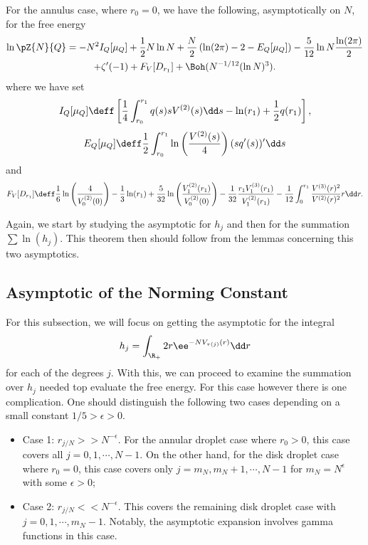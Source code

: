 \begin{teorema} 	\label{Theorem: Disk Free Energy}
	For the annulus case, where $r_0 = 0$, we have the following, asymptotically on $N$, for the free energy
	\begin{multline}
		\ln{\pZ{N}{Q}} = - N^2 I_Q[\mu_Q]  + \frac{1}{2} N \ln N + \frac{N}{2} \left(\ln(2\pi) - 2 - E_Q[\mu_Q]\right) - \frac{5}{12} \ln N \frac{\ln(2\pi)}{2} \\ + \zeta'(-1) + F_V[D_{r_1}] + \Boh(N^{-1/12}(\ln N)^3).
	\end{multline}
	where we have set
	\begin{equation}
		I_Q[\mu_Q] \deff \left[\frac{1}{4} \int_{r_0}^{r_1} q(s) s V^{(2)}(s) \dd s- \ln(r_1) + \frac{1}{2} q(r_1) \right],
	\end{equation}
	\begin{equation}
		E_Q[\mu_Q] \deff \frac{1}{2} \int_{r_0}^{r_1} \ln\left(\frac{V^{(2)}(s)}{4}\right) (sq'(s))' \dd s
	\end{equation}
	and
	\begin{equation}
		F_V[D_{r_1}] \deff \frac{1}{6} \ln{\left(\frac{4}{V^{(2)}_0(0)}\right)} - \frac{1}{3} \ln(r_1) + \frac{5}{32} \ln\left( \frac{V^{(2)}_1(r_1)}{V^{(2)}_{0}(0)} \right) - \frac{1}{32} \frac{r_1  V^{(3)}_1(r_1)}{V^{(2)}_1(r_1)} - \frac{1}{12} \int_{0}^{r_1} \frac{V^{(3)}(r)^2}{V^{(2)}(r)^{2}} r \dd r.
	\end{equation}
\end{teorema}

Again, we start by studying the asymptotic for $h_j$ and then for the summation $\sum \ln(h_j)$. This theorem then should follow from the lemmas concerning this two asymptotics.

\subsection{Asymptotic of the Norming Constant}

For this subsection, we will focus on getting the asymptotic for the integral
\begin{equation}
	h_j = \int_{\R_+} 2r \ee^{-N V_{\tau(j)}(r)} \dd r
\end{equation}
for each of the degrees $j$. With this, we can proceed to examine the summation over $h_j$ needed top evaluate the free energy. For this case however there is one complication. One should distinguish the following two cases depending on a small constant $1/5 > \epsilon > 0$. 

\begin{itemize}
	\item Case 1: $r_{j/N} >> N^{-\epsilon}$. For the annular droplet case where $r_0 > 0$, this case covers all $j = 0, 1, \cdots , N-1$. On the other hand, for the disk droplet case where $r_0 = 0$, this case covers only $j = m_N, m_N + 1, \cdots , N-1$ for $m_N = N^\epsilon$ with some $\epsilon > 0$;
	\item Case 2: $r_{j/N} << N^{-\epsilon}$. This covers the remaining disk droplet case with $j = 0, 1, \cdots, m_N-1$. Notably, the asymptotic expansion involves gamma functions in this case. 
\end{itemize}

